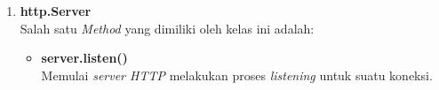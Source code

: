 \begin{enumerate}
	\item \textbf{http.Server} \\ 
%		
%	
%		
%		
%	
	Salah satu \textit{Method} yang dimiliki oleh kelas ini adalah:
	\begin{itemize}
		\item \textbf{server.listen()} \\ Memulai \textit{server HTTP} melakukan proses \textit{listening} untuk suatu koneksi.
	\end{itemize}
%		
%		
%		
\end{enumerate} 

